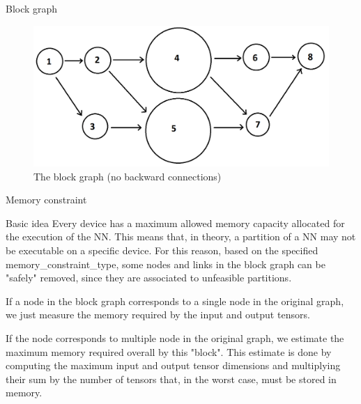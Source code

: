 \begin{frame}[allowframebreaks]{Block graph}
\begin{multicols}{2}
        \begin{figure}[h]
        \centering
    \includegraphics[width=0.75\linewidth]{Img/butcher/block_graph_no_backward_connections.png}
    \caption{The block graph (no backward connections)}
    \end{figure}
    \end{multicols}
    
    
    
\end{frame}

\begin{frame}{Memory constraint}
    \begin{block}{Basic idea}
    Every device has a maximum allowed memory capacity allocated for the execution of the NN. This means that, in theory, a partition of a NN may not be executable on a specific device. For this reason, based on the specified memory\_constraint\_type, some nodes and links in the block graph can be "safely" removed, since they are associated to unfeasible partitions.
    \end{block}
    
    If a node in the block graph corresponds to a single node in the original graph, we just measure the memory required by the input and output tensors. 
    
    If the node corresponds to multiple node in the original graph, we estimate the maximum memory required overall by this "block". This estimate is done by computing the maximum input and output tensor dimensions and multiplying their sum by the number of tensors that, in the worst case, must be stored in memory.
\end{frame}

